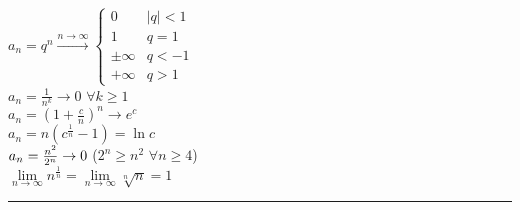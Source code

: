 		\begin{minipage}{4cm}
			$a_n=q^n  \overset{n \rightarrow \infty}{\longrightarrow}  \begin{cases} 0 & |q|<1 \\ 1 & q=1 \\ \pm \infty & q < -1  \\  + \infty & q > 1\end{cases}$ \\
			$a_n=\frac{1}{n^k}\rightarrow 0$ \qquad $\forall k \ge 1$\\
			$a_n=\left(1+\frac{c}{n}\right)^n \rightarrow e^c$ \\
			$a_n=n\left(c^{\frac1{n}}-1\right) = \ln c$\\
			$a_n=\frac{n^2}{2^n}\rightarrow 0$ \quad ($2^n \ge n^2$  $\forall n\ge 4$) \\
			$\lim\limits_{n\to\infty}n^{\frac{1}{n}}=\lim\limits_{n\to\infty}\sqrt[n]{n}=1$
		\end{minipage}
		
		\hrule
